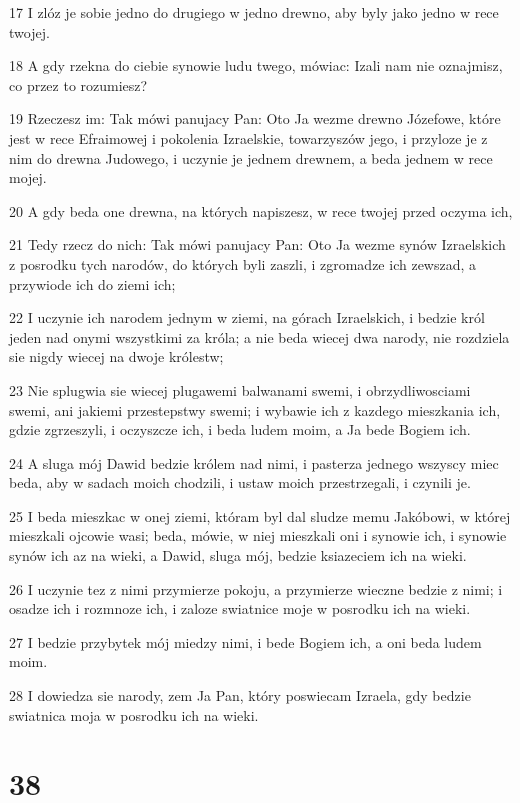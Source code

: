 \par 17 I zlóz je sobie jedno do drugiego w jedno drewno, aby byly jako jedno w rece twojej.
\par 18 A gdy rzekna do ciebie synowie ludu twego, mówiac: Izali nam nie oznajmisz, co przez to rozumiesz?
\par 19 Rzeczesz im: Tak mówi panujacy Pan: Oto Ja wezme drewno Józefowe, które jest w rece Efraimowej i pokolenia Izraelskie, towarzyszów jego, i przyloze je z nim do drewna Judowego, i uczynie je jednem drewnem, a beda jednem w rece mojej.
\par 20 A gdy beda one drewna, na których napiszesz, w rece twojej przed oczyma ich,
\par 21 Tedy rzecz do nich: Tak mówi panujacy Pan: Oto Ja wezme synów Izraelskich z posrodku tych narodów, do których byli zaszli, i zgromadze ich zewszad, a przywiode ich do ziemi ich;
\par 22 I uczynie ich narodem jednym w ziemi, na górach Izraelskich, i bedzie król jeden nad onymi wszystkimi za króla; a nie beda wiecej dwa narody, nie rozdziela sie nigdy wiecej na dwoje królestw;
\par 23 Nie splugwia sie wiecej plugawemi balwanami swemi, i obrzydliwosciami swemi, ani jakiemi przestepstwy swemi; i wybawie ich z kazdego mieszkania ich, gdzie zgrzeszyli, i oczyszcze ich, i beda ludem moim, a Ja bede Bogiem ich.
\par 24 A sluga mój Dawid bedzie królem nad nimi, i pasterza jednego wszyscy miec beda, aby w sadach moich chodzili, i ustaw moich przestrzegali, i czynili je.
\par 25 I beda mieszkac w onej ziemi, któram byl dal sludze memu Jakóbowi, w której mieszkali ojcowie wasi; beda, mówie, w niej mieszkali oni i synowie ich, i synowie synów ich az na wieki, a Dawid, sluga mój, bedzie ksiazeciem ich na wieki.
\par 26 I uczynie tez z nimi przymierze pokoju, a przymierze wieczne bedzie z nimi; i osadze ich i rozmnoze ich, i zaloze swiatnice moje w posrodku ich na wieki.
\par 27 I bedzie przybytek mój miedzy nimi, i bede Bogiem ich, a oni beda ludem moim.
\par 28 I dowiedza sie narody, zem Ja Pan, który poswiecam Izraela, gdy bedzie swiatnica moja w posrodku ich na wieki.

\chapter{38}

